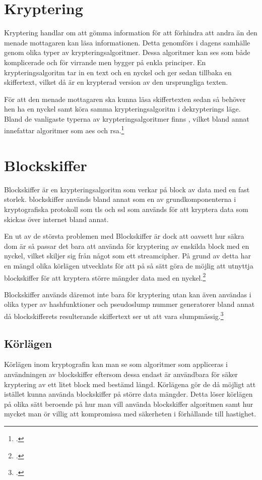
\section{Kryptering}
Kryptering handlar om att gömma information för att förhindra att andra än den menade mottagaren kan läsa informationen.
Detta genomförs i dagens samhälle genom olika typer av krypteringsalgoritmer. Dessa algoritmer kan ses som både komplicerade
och för virrande men bygger på enkla principer. En krypteringsalgoritm tar in en text och en nyckel och ger sedan tillbaka en
skiffertext, vilket då är en krypterad version av den ursprungliga texten.

För att den menade mottagaren ska kunna läsa skiffertexten sedan så behöver hen ha en nyckel samt köra samma krypteringsalgoritm
i dekrypterings läge. Bland de vanligaste typerna av krypteringsalgoritmer finns ,
vilket bland annat innefattar algoritmer som \acrshort{aes} och \gls{rsa}.\footcite{kryptering}

\section{Blockskiffer}
\label{sec:blockskiffer}
Blockskiffer är en krypteringsalgoritm som verkar på block av data med en fast storlek.
blockskiffer används bland annat som en av grundkomponenterna i kryptografiska protokoll som \acrfull{tls} och \acrfull{ssl}
som används för att kryptera data som skickas över internet bland annat.

En ut av de största problemen med Blockskiffer är dock att oavsett hur säkra dom är så passar det bara att använda
för kryptering av enskilda block med en nyckel, vilket skiljer sig från något som ett \gls{streamcipher}.
På grund av detta har en mängd olika körlägen utvecklats för att på så sätt göra de möjlig att utnyttja
blockskiffer för att kryptera större mängder data med en nyckel.\footcite{blockskiffer-ref}

Blockskiffer används däremot inte bara för kryptering utan kan även användas i olika typer av \gls{hashfunktion}er  %
och \gls{pseudoslump} nummer generatorer bland annat då blockskifferets resulterande skiffertext ser ut att vara slumpmässig.\footcite{blockskiffer-ref}

\subsection{Körlägen}
Körlägen inom kryptografin kan man se som algoritmer som appliceras i användningen av
blockskiffer eftersom dessa endast är användbara för säker kryptering av ett litet block med bestämd längd.
Körlägena gör de då möjligt att istället kunna använda blockskiffer på större data mängder.
Detta löser körlägen på olika sätt beroende på hur man vill använda blockskiffer algoritmen samt hur
mycket man ör villig att kompromissa med säkerheten i förhållande till hastighet.

